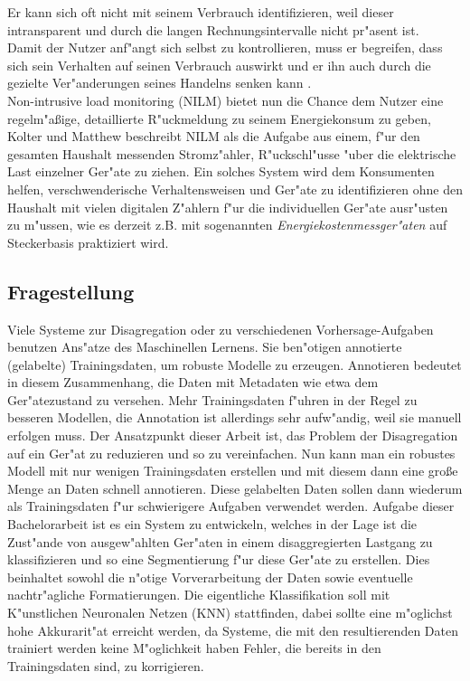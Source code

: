 	Er kann sich oft nicht mit seinem Verbrauch identifizieren, weil dieser intransparent und durch die langen Rechnungsintervalle nicht pr"asent ist. \\
	Damit der Nutzer anf"angt sich selbst zu kontrollieren, muss er begreifen, dass sich sein Verhalten auf seinen Verbrauch auswirkt und er ihn auch durch die gezielte Ver"anderungen seines Handelns senken kann \cite{fischer2008feedback}.\\
	Non-intrusive load monitoring (NILM) bietet nun die Chance dem Nutzer eine regelm"a{\ss}ige, detaillierte R"uckmeldung zu seinem Energiekonsum zu geben, Kolter und Matthew \cite{kolter2011redd} beschreibt NILM als die Aufgabe aus einem, f"ur den gesamten Haushalt messenden Stromz"ahler, R"uckschl"usse "uber die elektrische Last einzelner Ger"ate zu ziehen.
	Ein solches System wird dem Konsumenten helfen, verschwenderische Verhaltensweisen und Ger"ate zu identifizieren ohne den Haushalt mit vielen digitalen Z"ahlern f"ur die individuellen Ger"ate ausr"usten zu m"ussen, wie es derzeit z.B. mit sogenannten \textit{Energiekostenmessger"aten} auf Steckerbasis praktiziert wird.

\subsection{Fragestellung}
\label{Fragestellung}
 	Viele Systeme zur Disagregation oder zu verschiedenen Vorhersage-Aufgaben benutzen Ans"atze des Maschinellen Lernens. Sie ben"otigen annotierte (gelabelte) Trainingsdaten, um robuste Modelle zu erzeugen. Annotieren bedeutet in diesem Zusammenhang, die Daten mit Metadaten wie etwa dem Ger"atezustand zu versehen. Mehr Trainingsdaten f"uhren in der Regel zu besseren Modellen, die Annotation ist allerdings sehr aufw"andig, weil sie manuell erfolgen muss. Der Ansatzpunkt dieser Arbeit ist, das Problem der Disagregation auf ein Ger"at zu reduzieren und so zu vereinfachen. Nun kann man ein robustes Modell mit nur wenigen Trainingsdaten erstellen und mit diesem dann eine gro{\ss}e Menge an Daten schnell annotieren. Diese gelabelten Daten sollen dann wiederum als Trainingsdaten f"ur schwierigere Aufgaben verwendet werden. 
	Aufgabe dieser Bachelorarbeit ist es ein System zu entwickeln, welches in der Lage ist die Zust"ande von ausgew"ahlten Ger"aten in einem disaggregierten Lastgang zu klassifizieren und so eine Segmentierung f"ur diese Ger"ate zu erstellen. Dies beinhaltet sowohl die n"otige Vorverarbeitung der Daten sowie eventuelle nachtr"agliche Formatierungen. Die eigentliche Klassifikation soll mit K"unstlichen Neuronalen Netzen (KNN) stattfinden, dabei sollte eine m"oglichst hohe Akkurarit"at erreicht werden, da Systeme, die mit den resultierenden Daten trainiert werden keine M"oglichkeit haben Fehler, die bereits in den Trainingsdaten sind, zu korrigieren. 

